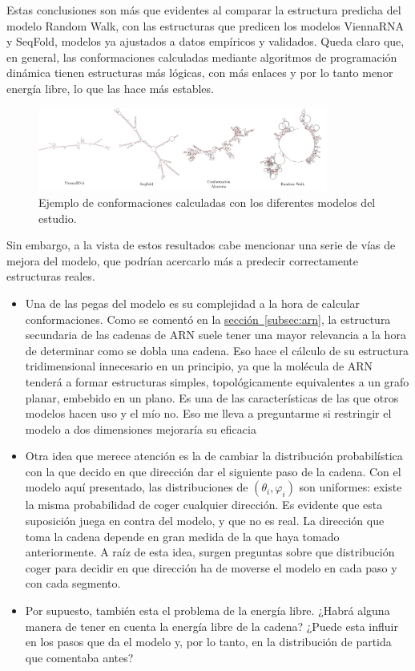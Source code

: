 \documentclass[a4paper,11pt,titlepage]{article}
\newcommand{\nr}[2][sección]{\hyperref[#2]{#1~\ref{#2}}}
\renewcommand{\phi}{\varphi}
\theoremstyle{definition}
\begin{document}
Estas conclusiones son más que evidentes al comparar la estructura predicha del modelo Random Walk, con las estructuras que predicen los modelos ViennaRNA y SeqFold, modelos ya ajustados a datos empíricos y validados. Queda claro que, en general, las conformaciones calculadas mediante algoritmos de programación dinámica tienen estructuras más lógicas, con más enlaces y por lo tanto menor energía libre, lo que las hace más estables. 

\begin{figure}[H]
    \centering
    \includegraphics[width=0.85\textwidth]{images/RNA_conformations.png}
    \caption{Ejemplo de conformaciones calculadas con los diferentes modelos del estudio.}
    \label{fig:RNA_conformations}
\end{figure}

Sin embargo, a la vista de estos resultados cabe mencionar una serie de vías de mejora del modelo, que podrían acercarlo más a predecir correctamente estructuras reales.

\begin{itemize}
    \item Una de las pegas del modelo es su complejidad a la hora de calcular conformaciones. Como se comentó en la \nr[sección]{subsec:arn}, la estructura secundaria de las cadenas de ARN suele tener una mayor relevancia a la hora de determinar como se dobla una cadena. Eso hace el cálculo de su estructura tridimensional innecesario en un principio, ya que la molécula de ARN tenderá a formar estructuras simples, topológicamente equivalentes a un grafo planar, embebido en un plano. Es una de las características de las que otros modelos hacen uso y el mío no. Eso me lleva a preguntarme si restringir el modelo a dos dimensiones mejoraría su eficacia
    \item Otra idea que merece atención es la de cambiar la distribución probabilística con la que decido en que dirección dar el siguiente paso de la cadena. Con el modelo aquí presentado, las distribuciones de $(\theta_i, \phi_i)$ son uniformes: existe la misma probabilidad de coger cualquier dirección. Es evidente que esta suposición juega en contra del modelo, y que no es real. La dirección que toma la cadena depende en gran medida de la que haya tomado anteriormente. A raíz de esta idea, surgen preguntas sobre que distribución coger para decidir en que dirección ha de moverse el modelo en cada paso y con cada segmento.
    \item Por supuesto, también esta el problema de la energía libre. ¿Habrá alguna manera de tener en cuenta la energía libre de la cadena? ¿Puede esta influir en los pasos que da el modelo y, por lo tanto, en la distribución de partida que comentaba antes?
\end{itemize}
\end{document}
